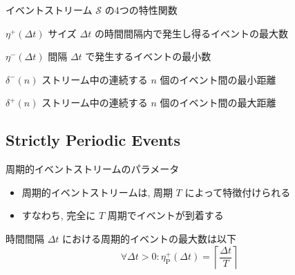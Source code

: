 \begin{frame}{イベントストリーム $\mathcal{S}$ の4つの特性関数}
    \begin{block}{$\eta^{+}(\Delta t)$}
        サイズ $\Delta t$ の時間間隔内で発生し得るイベントの最大数
    \end{block}
    \begin{block}{$\eta^{-}(\Delta t)$}
        間隔 $\Delta t$ で発生するイベントの最小数
    \end{block}
    \begin{block}{$\delta^{-}(n)$}
        ストリーム中の連続する $n$ 個のイベント間の最小距離
    \end{block}
    \begin{block}{$\delta^{+}(n)$}
        ストリーム中の連続する $n$ 個のイベント間の最大距離
    \end{block}
\end{frame}


\subsection{Strictly Periodic Events}
\label{ssec: strictly periodic events}

\begin{frame}{周期的イベントストリームのパラメータ}
    \begin{itemize}
        \item 周期的イベントストリームは, 周期 $T$ によって特徴付けられる
        \item すなわち, 完全に $T$ 周期でイベントが到着する
    \end{itemize}
\end{frame}

\begin{frame}{}
    時間間隔 $\Delta t$ における周期的イベントの最大数は以下
    \begin{equation*}
        \forall \Delta t>0: \eta_{\mathrm{P}}^{+}(\Delta t)=\left\lceil\frac{\Delta t}{T}\right\rceil
    \end{equation*}
\end{frame}

\begin{frame}{}
\end{frame}


